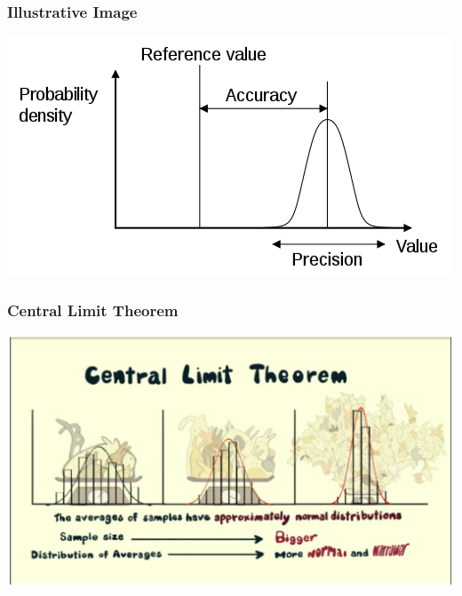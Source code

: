 \documentclass[slides]{beamer}
\begin{document}
\begin{frame}[fragile]
\frametitle{Illustrative Image}

\begin{center}
\includegraphics[width=\textwidth]{figure/Accuracy_and_precision.png}
\end{center}

\end{frame}


\begin{frame}
\frametitle{Central Limit Theorem}
\begin{center}
\includegraphics[width=\textwidth]{figure/CLT.png}
\end{center}
\end{frame}
\end{document}
